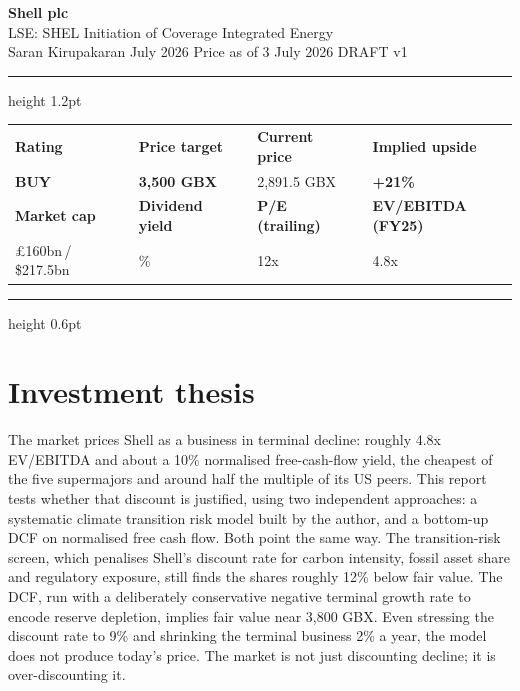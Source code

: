 \documentclass[10pt,a4paper]{article}
\newcommand{\thead}[1]{{\sffamily\bfseries\footnotesize\color{navy}#1}}
\newcommand{\about}{\raisebox{0.4ex}{\texttildelow}}
\begin{document}
\begin{center}
{\sffamily\bfseries\fontsize{20}{24}\selectfont\color{navy}Shell plc}\\[3pt]
{\sffamily\fontsize{11}{13}\selectfont\color{grey}LSE: SHEL \quad\textbullet\quad Initiation of Coverage \quad\textbullet\quad Integrated Energy}\\[2pt]
{\sffamily\footnotesize\color{grey}Saran Kirupakaran \quad\textbullet\quad July 2026 \quad\textbullet\quad Price as of 3 July 2026 \quad\textbullet\quad DRAFT v1}
\end{center}

\vspace{2pt}
{\color{navy}\hrule height 1.2pt}
\vspace{8pt}

\noindent
\begin{tabularx}{\textwidth}{@{}l X l X l X l@{}}
\thead{Rating} & & \thead{Price target} & & \thead{Current price} & & \thead{Implied upside}\\
{\sffamily\bfseries\large\color{accent}BUY} & & {\sffamily\bfseries\large 3,500 GBX} & & {\sffamily\large 2,891.5 GBX} & & {\sffamily\bfseries\large +21\%}\\[4pt]
\thead{Market cap} & & \thead{Dividend yield} & & \thead{P/E (trailing)} & & \thead{EV/EBITDA (FY25)}\\
{\sffamily\pounds160bn\,/\,\$217.5bn} & & {\sffamily 3.8\%} & & {\sffamily\about12x} & & {\sffamily\about4.8x}\\
\end{tabularx}

\vspace{8pt}
{\color{rule}\hrule height 0.6pt}

\section{Investment thesis}

The market prices Shell as a business in terminal decline: roughly 4.8x EV/EBITDA and about a 10\% normalised free-cash-flow yield, the cheapest of the five supermajors and around half the multiple of its US peers. This report tests whether that discount is justified, using two independent approaches: a systematic climate transition risk model built by the author, and a bottom-up DCF on normalised free cash flow. Both point the same way. The transition-risk screen, which penalises Shell's discount rate for carbon intensity, fossil asset share and regulatory exposure, still finds the shares roughly 12\% below fair value. The DCF, run with a deliberately conservative negative terminal growth rate to encode reserve depletion, implies fair value near 3,800 GBX. Even stressing the discount rate to 9\% and shrinking the terminal business 2\% a year, the model does not produce today's price. The market is not just discounting decline; it is over-discounting it.
\end{document}
